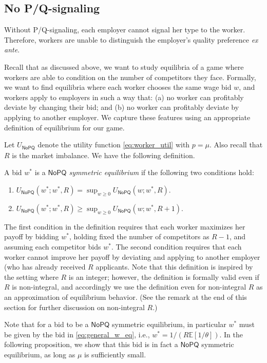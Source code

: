 \documentclass[11pt]{article}
\newcommand{\NoHT}{\ensuremath{\mathsf{NoPQ}}}
\newcommand{\E}{\ensuremath{\mathbb{E}}}
\newcommand{\hottowel}{P/Q-signaling}
\begin{document}
\subsection{No \hottowel}

Without \hottowel, each employer cannot signal her type to the worker.  
Therefore, workers are unable to distinguish the employer's quality preference {\em ex ante}.

Recall that as discussed above, we want to study equilibria of a game where workers are able to condition on the number of competitors they face.  
Formally, we want to find equilibria where each worker chooses the same wage bid $w$, and workers apply to employers in such a way that:
(a) no worker can profitably deviate by changing their bid; and
(b) no worker can profitably deviate by applying to another employer.
We capture these features using an appropriate definition of equilibrium for our game.

Let $U_{\NoHT}$ denote the utility function \eqref{eq:worker_util} with $p = \mu$.
Also recall that $R$ is the market imbalance.
We have the following definition.

\begin{definition}
\label{def:noht}
A bid $w^*$ is a {\em $\NoHT$ symmetric equilibrium} if the following two conditions hold:
\begin{enumerate}
\item $U_{\NoHT}(w^* ; w^*, R) = \sup_{w\geq 0} U_{\NoHT}(w ; w^*, R)$.
\item $U_{\NoHT}(w^* ; w^*, R) \geq \sup_{w \geq 0} U_{\NoHT}(w ; w^*, R+1)$.
\end{enumerate}
\end{definition}

The first condition in the definition requires that each worker maximizes her payoff by bidding $w^*$, holding fixed the number of competitors as $R - 1$, and assuming each competitor bids $w^*$.  
The second condition requires that each worker cannot improve her payoff by deviating and applying to another employer (who has already received $R$ applicants.
Note that this definition is inspired by the setting where $R$ is an integer; however, the definition is formally valid even if $R$ is non-integral, and accordingly we use the definition even for non-integral $R$ as an approximation of equilibrium behavior.  
(See the remark at the end of this section for further discussion on non-integral $R$.)

Note that for a bid to be a $\NoHT$ symmetric equilibrium, in particular $w^*$ must be given by the bid in \eqref{eq:general_w_eq}, i.e., $w^* = 1/(R\E[1/\theta])$.
In the following proposition, we show that this bid is in fact a $\NoHT$ symmetric equilibrium, as long as $\mu$ is sufficiently small.
\end{document}
